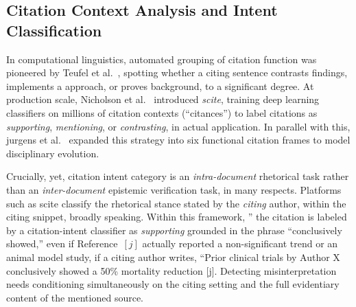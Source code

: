 \documentclass[journal]{IEEEtran}
\begin{document}
\subsection{Citation Context Analysis and Intent Classification}
In computational linguistics, automated grouping of citation function was pioneered by Teufel et al.\ \cite{teufel2006automatic}, spotting whether a citing sentence contrasts findings, implements a approach, or proves background, to a significant degree. At production scale, Nicholson et al.\ \cite{nicholson2021scite} introduced \emph{scite}, training deep learning classifiers on millions of citation contexts (``citances'') to label citations as \emph{supporting}, \emph{mentioning}, or \emph{contrasting}, in actual application. In parallel with this, jurgens et al.\ \cite{jurgens2018measuring} expanded this strategy into six functional citation frames to model disciplinary evolution.

Crucially, yet, citation intent category is an \emph{intra-document} rhetorical task rather than an \emph{inter-document} epistemic verification task, in many respects. Platforms such as scite \cite{nicholson2021scite} classify the rhetorical stance stated by the \emph{citing} author, within the citing snippet, broadly speaking. Within this framework, '' the citation is labeled by a citation-intent classifier as \emph{supporting} grounded in the phrase ``conclusively showed,'' even if Reference~$[j]$ actually reported a non-significant trend or an animal model study, if a citing author writes, ``Prior clinical trials by Author X conclusively showed a 50\% mortality reduction [j]. Detecting misinterpretation needs conditioning simultaneously on the citing setting and the full evidentiary content of the mentioned source.
\end{document}
